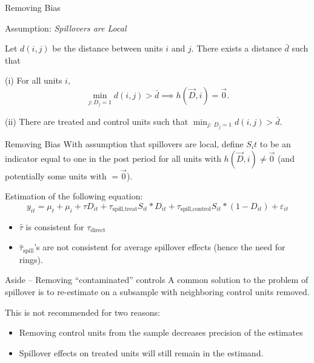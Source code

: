 \documentclass[aspectratio=169]{beamer}
\begin{document}
\begin{frame}{Removing Bias}
    
    \begin{block}{Assumption: {\it Spillovers are Local}}

    Let $d(i,j)$ be the distance between units $i$ and $j$. There exists a distance $\bar{d}$ such that 
        
        (i) For all units $i$,
        \[ 
            \min_{j: D_j = 1} d(i,j) > \bar{d} \implies h(\vec{D}, i) = \vec{0}. 
        \]
    
        (ii) There are treated and control units such that $\min_{j: \ D_j = 1} d(i,j) > \bar{d}$.

    \end{block}
\end{frame}

\begin{frame}{Removing Bias}
    With assumption that spillovers are local, define $S_it$ to be an indicator equal to one in the post period for all units with $h(\vec{D}, i) \neq \vec{0}$ (and potentially some units with $= \vec{0}$).
    
    Estimation of the following equation:
    \[ 
        y_{it} = \mu_t + \mu_i + \tau D_{it} + \tau_{\text{spill,treat}} S_{it} * D_{it} + \tau_{\text{spill,control}} S_{it} * (1-D_{it}) + \varepsilon_{it}
    \]

    \begin{itemize}
        \item $\hat{\tau}$ is consistent for $\tau_{\text{direct}}$
        
        \item $\hat{\tau}_{\text{spill}}$'s are not consistent for average spillover effects (hence the need for rings).
    \end{itemize}

\end{frame}

\begin{frame}{Aside -- Removing ``contaminated'' controls}
    A common solution to the problem of spillover is to re-estimate on a subsample with neighboring control units removed.

    This is not recommended for two reasons:

    \begin{itemize}
        \item Removing control units from the sample decreases precision of the estimates
        
        \item Spillover effects on treated units will still remain in the estimand. 
    \end{itemize}
\end{frame}
\end{document}
